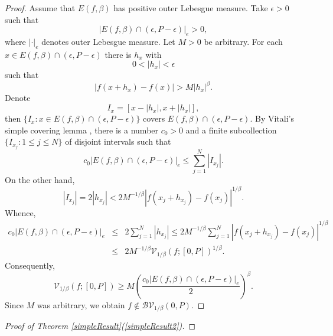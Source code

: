 \documentclass{amsart}
\numberwithin{equation}{section}
\begin{document}
\begin{proof}
    Assume that $E(f,\beta)$ has positive outer Lebesgue measure. Take $\epsilon>0$ such that 
    \begin{equation}
        \nonumber
        |E(f,\beta)\cap (\epsilon, P-\epsilon)|_e>0,
    \end{equation}
    where $|\cdot|_e$ denotes outer Lebesgue measure.
    Let $M>0$ be arbitrary. For each $x\in E(f,\beta)\cap(\epsilon,P-\epsilon)$ there is $h_x$ with
    \begin{equation}
        \nonumber
        0<|h_x|<\epsilon
    \end{equation}
    such that
    \begin{equation}
        \nonumber
        |f(x+h_x)-f(x)|>M|h_x|^\beta.
    \end{equation}
    Denote 
    \begin{equation}
        \nonumber
        I_x=[x-|h_x|,x+|h_x|],
    \end{equation}
    then $\{I_x:x\in E(f,\beta)\cap (\epsilon,P-\epsilon)\}$ covers $E(f,\beta)\cap (\epsilon,P-\epsilon)$. By Vitali's simple covering lemma \cite[p. 102]{WeZy77}, there is a number $c_0>0$ and a finite subcollection $\{I_{x_j}:1\le j\le N\}$ of disjoint intervals such that 
    \begin{equation}
        \nonumber
        c_0|E(f,\beta)\cap(\epsilon,P-\epsilon)|_e\le\sum_{j=1}^N|I_{x_j}|.
    \end{equation}
    On the other hand, 
    \begin{equation}
        \nonumber
        |I_{x_j}|=2|h_{x_j}|<2M^{-1/\beta}|f(x_j+h_{x_j})-f(x_j)|^{1/\beta}.
    \end{equation}
    Whence,
    \begin{eqnarray}
        \nonumber
        c_0|E(f,\beta)\cap(\epsilon,P-\epsilon)|_e&\le&2\sum_{j=1}^N|h_{x_j}|\le 2M^{-1/\beta}\sum_{j=1}^N|f(x_j+h_{x_j})-f(x_j)|^{1/\beta}\\
        \nonumber
        &\le& 2M^{-1/\beta}\mathcal{V}_{1/\beta}(f;[0,P])^{1/\beta} .
    \end{eqnarray}
    Consequently,
    \begin{equation}
        \nonumber
        \mathcal{V}_{1/\beta}(f;[0,P])\ge M\left(\frac{c_0|E(f,\beta)\cap(\epsilon,P-\epsilon)|_e}{2}\right)^\beta.
    \end{equation}
    Since $M$ was arbitrary, we obtain $f\notin\mathcal{BV}_{1/\beta}(0,P)$.
\end{proof}\begin{proof}[Proof of Theorem \ref{simpleResult}(\ref{simpleResult2})]

\end{proof}
\end{document}
